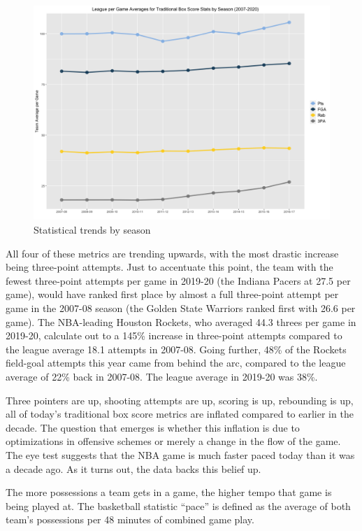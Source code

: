 \documentclass [MS] {uclathes}
\begin{document}
\begin{figure}[h]
\centering
  \includegraphics[width=500px]{stats_season_avg.png}
  \caption{Statistical trends by season}
  \label{fig:statstrends}
\end{figure}


All four of these metrics are trending upwards, with the most drastic increase being three-point attempts. Just to accentuate this point, the team with the fewest three-point attempts per game in 2019-20 (the Indiana Pacers at 27.5 per game), would have ranked first place by almost a full three-point attempt per game in the 2007-08 season (the Golden State Warriors ranked first with 26.6 per game). The NBA-leading Houston Rockets, who averaged 44.3 threes per game in 2019-20, calculate out to a 145\% increase in three-point attempts compared to the league average 18.1 attempts in 2007-08. Going further, 48\% of the Rockets field-goal attempts this year came from behind the arc, compared to the league average of 22\% back in 2007-08. The league average in 2019-20 was 38\%. 

Three pointers are up, shooting attempts are up, scoring is up, rebounding is up, all of today's traditional box score metrics are inflated compared to earlier in the decade. The question that emerges is whether this inflation is due to optimizations in offensive schemes or merely a change in the flow of the game. The eye test suggests that the NBA game is much faster paced today than it was a decade ago. As it turns out, the data backs this belief up. 

The more possessions a team gets in a game, the higher tempo that game is being played at. The basketball statistic ``pace'' is defined as the average of both team's possessions per 48 minutes of combined game play. \\
\end{document}
